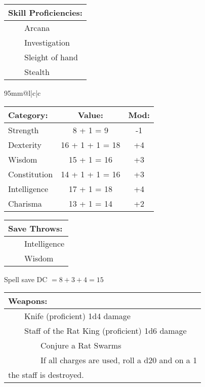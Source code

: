 \documentclass[11pt]{article}
\newcommand{\tabitem}{~~\llap{--}~~}
\newcommand{\tabtabitem}{~~~~~~\llap{$\bullet$}~~}
\begin{document}
\begin{multicols}{2}
\vspace{2mm}
		
\noindent \begin{tabularx}{95mm}{@{}l}
{\Large \textbf{Skill Proficiencies:}} \\
\hline
\tabitem Arcana \\
\tabitem Investigation \\
\tabitem Sleight of hand \\
\tabitem Stealth
		\end{tabularx}

\vspace{4mm}

\noindent \begin{tabularx}{95mm}{@{}l|c|c}
 \\
\hline
		\end{tabularx}
\noindent \begin{tabular}{@{}l|c|c}
\textbf{Category:} 			& \textbf{Value:} 	& \textbf{Mod:} \\
\hline
Strength 					& 8 + 1 = 9 		& -1 			\\
Dexterity 					& 16 + 1 + 1 = 18 	& +4 			\\
Wisdom 						& 15 + 1 = 16		& +3 			\\
Constitution 				& 14 + 1 + 1 = 16	& +3 			\\
Intelligence 				& 17 + 1 = 18		& +4 			\\
Charisma 					& 13 + 1 = 14		& +2
		\end{tabular}

\vspace{4mm}

\noindent \begin{tabularx}{95mm}{@{}l}
{\Large \textbf{Save Throws:}} \\
\hline
\tabitem Intelligence \\
\tabitem Wisdom
		\end{tabularx}
\noindent Spell save DC $= 8 + 3 + 4 = 15$

\vspace{4mm}

\noindent \begin{tabularx}{95mm}{@{}l}
{\Large \textbf{Weapons:}} \\
\hline
\tabitem Knife (proficient) 1d4 damage \\
\tabitem Staff of the Rat King (proficient) 1d6 damage \\
\tabtabitem Conjure a Rat Swarms \\
\tabtabitem If all charges are used, roll a d20 and on a 1 \\ 
the staff is destroyed.
		\end{tabularx}


\end{multicols}
\end{document}
